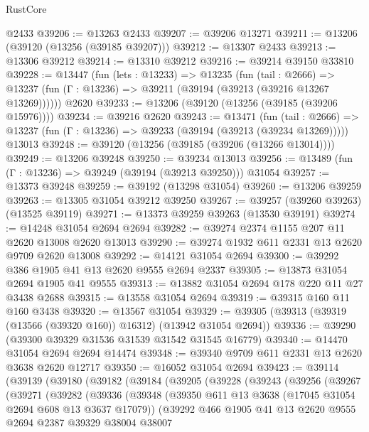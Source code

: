 \begin{lexlean}{RustCore}
\begin{coremodule}
    @2433
@39206 := @13263 @2433
@39207 := @39206 @13271
@39211 := @13206 (@39120 (@13256 (@39185 @39207)))
@39212 := @13307 @2433
@39213 := @13306 @39212
@39214 := @13310 @39212
@39216 := @39214 @39150 @33810
@39228 := @13447
    (fun (lets : @13233) =>
    @13235
      (fun (tail : @2666) =>
      @13237 (fun (Γ : @13236) => @39211 (@39194 (@39213 (@39216 @13267 @13269))))))
    @2620
@39233 := @13206 (@39120 (@13256 (@39185 (@39206 @15976))))
@39234 := @39216 @2620
@39243 := @13471
    (fun (tail : @2666) => @13237 (fun (Γ : @13236) => @39233 (@39194 (@39213 (@39234 @13269)))))
    @13013
@39248 := @39120 (@13256 (@39185 (@39206 (@13266 @13014))))
@39249 := @13206 @39248
@39250 := @39234 @13013
@39256 := @13489 (fun (Γ : @13236) => @39249 (@39194 (@39213 @39250))) @31054
@39257 := @13373 @39248
@39259 := @39192 (@13298 @31054)
@39260 := @13206 @39259
@39263 := @13305 @31054 @39212 @39250
@39267 := @39257 (@39260 @39263) (@13525 @39119)
@39271 := @13373 @39259 @39263 (@13530 @39191)
@39274 := @14248 @31054 @2694 @2694
@39282 := @39274 @2374 @1155 @207 @11 @2620 @13008 @2620 @13013
@39290 := @39274 @1932 @611 @2331 @13 @2620 @9709 @2620 @13008
@39292 := @14121 @31054 @2694
@39300 := @39292 @386 @1905 @41 @13 @2620 @9555 @2694 @2337
@39305 := @13873 @31054 @2694 @1905 @41 @9555
@39313 := @13882 @31054 @2694 @178 @220 @11 @27 @3438 @2688
@39315 := @13558 @31054 @2694
@39319 := @39315 @160 @11 @160 @3438
@39320 := @13567 @31054
@39329 := @39305 (@39313 (@39319 (@13566 (@39320 @160)) @16312) (@13942 @31054 @2694))
@39336 := @39290 (@39300 @39329 @31536 @31539 @31542 @31545 @16779)
@39340 := @14470 @31054 @2694 @2694 @14474
@39348 := @39340 @9709 @611 @2331 @13 @2620 @3638 @2620 @12717
@39350 := @16052 @31054 @2694
@39423 := @39114
    (@39139
      (@39180
        (@39182
          (@39184
            (@39205
              (@39228
                (@39243
                  (@39256
                    (@39267
                      (@39271
                        (@39282
                          (@39336
                            (@39348
                              (@39350 @611 @13 @3638 (@17045 @31054 @2694 @608 @13 @3637 @17079))
                              (@39292
                                @466
                                @1905
                                @41
                                @13
                                @2620
                                @9555
                                @2694
                                @2387
                                @39329
                                @38004
                                @38007

\end{coremodule}
\end{lexlean}
